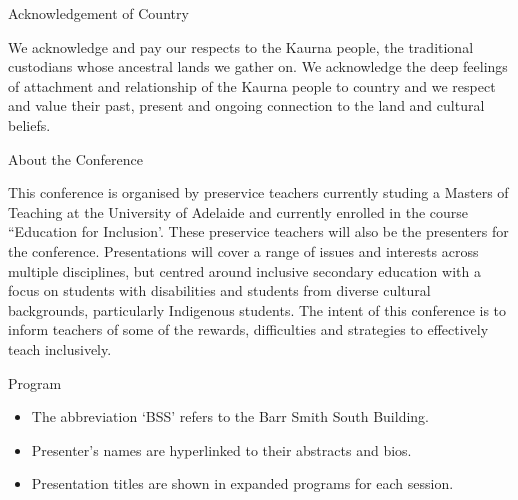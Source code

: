 \documentclass[twoside,12pt,a4paper,notitlepage]{memoir}
\newcounter{chapternonum}
\begin{document}
\pagestyle{plain}



\setcounter{tocdepth}{2}
\tableofcontents
\vfill

\clearpage{}
\vspace*{2cm}
{\Huge Acknowledgement of Country}
\vspace{2cm}

We acknowledge and pay our respects to the Kaurna people, the traditional custodians whose ancestral lands we gather on. We acknowledge the deep feelings of attachment and relationship of the Kaurna people to country and we respect and value their past, present and ongoing connection to the land and cultural beliefs.
\vfill

\clearpage{}
\vspace*{2cm}
{\Huge About the Conference}
\vspace{2cm}

This conference is organised by preservice teachers currently studing a Masters of Teaching at the University of Adelaide and currently enrolled in the course ``Education for Inclusion'. These preservice teachers will also be the presenters for the conference. Presentations will cover a range of issues and interests across multiple disciplines, but centred around inclusive secondary education with a focus on students with disabilities and students from diverse cultural backgrounds, particularly Indigenous students. The intent of this conference is to inform teachers of some of the rewards, difficulties and strategies to effectively teach inclusively. 
\vfill




%

\clearpage{}
\vspace*{2cm}
{\Huge Program}
\vspace{2cm}

\begin{itemize}
	\item The abbreviation `BSS' refers to the Barr Smith South Building.
	\item Presenter's names are hyperlinked to their abstracts and bios.
	\item Presentation titles are shown in expanded programs for each session.
\end{itemize}
\end{document}
